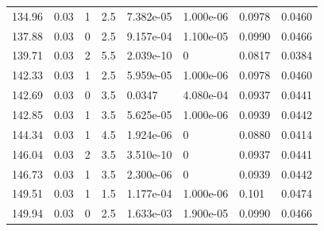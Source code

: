 \documentclass[preview]{standalone}
\begin{document}
{{{\begin{tabular}{L{1.2cm}C{1.2cm} C{0.3cm}C{0.5cm} C{1.4cm}C{1.4cm} C{1.4cm}C{1.4cm}}
  134.96  &  0.03  & 1     & 2.5 &  7.382e-05  & 1.000e-06  & 0.0978 &  0.0460   \\ 
  137.88  &  0.03  & 0     & 2.5 &  9.157e-04  & 1.100e-05  & 0.0990 &  0.0466   \\ 
  139.71  &  0.03  & 2     & 5.5 &  2.039e-10  & 0  & 0.0817 &  0.0384   \\ 
  142.33  &  0.03  & 1     & 2.5 &  5.959e-05  & 1.000e-06  & 0.0978 &  0.0460   \\ 
  142.69  &  0.03  & 0     & 3.5 &  0.0347  & 4.080e-04  & 0.0937 &  0.0441   \\ 
  142.85  &  0.03  & 1     & 3.5 &  5.625e-05  & 1.000e-06  & 0.0939 &  0.0442   \\ 
  144.34  &  0.03  & 1     & 4.5 &  1.924e-06  & 0  & 0.0880 &  0.0414   \\ 
  146.04  &  0.03  & 2     & 3.5 &  3.510e-10  & 0  & 0.0937 &  0.0441   \\ 
  146.73  &  0.03  & 1     & 3.5 &  2.300e-06  & 0  & 0.0939 &  0.0442   \\ 
  149.51  &  0.03  & 1     & 1.5 &  1.177e-04  & 1.000e-06  & 0.101 &  0.0474   \\ 
  149.94  &  0.03  & 0     & 2.5 &  1.633e-03  & 1.900e-05  & 0.0990 &  0.0466   \\ 
\hline 
\end{tabular} 

}}}
\end{document}
